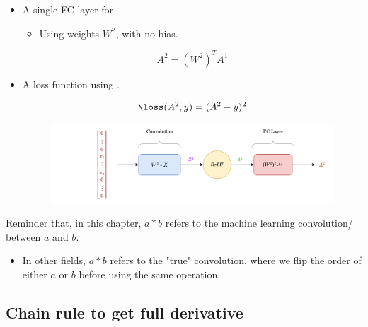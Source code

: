 \begin{itemize}
            \item A single FC layer for 
                \begin{itemize}
                    \item Using weights $W^2$, with no bias.
                \end{itemize}
    
                \begin{equation}
                    A^2 = (W^2)^T A^1
                \end{equation}
    
            \item A loss function using .
            
                \begin{equation}
                    \loss(A^2, y) = (A^2-y)^2
                \end{equation}
    
            \begin{figure}[H]
                \includegraphics[width=\textwidth]{images/convolutional_neural_networks_images/simple_cnn.png}
            \end{figure}
        \end{itemize}

        \begin{notation}
            Reminder that, in this chapter, $a \ast b$ refers to the machine learning convolution/ between $a$ and $b$.

            \begin{itemize}
                \item In other fields, $a \ast b$ refers to the "true" convolution, where we flip the order of either $a$ or $b$ before using the same operation.
            \end{itemize}
        \end{notation}

        \pagebreak

    \subsection{Chain rule to get full derivative}

